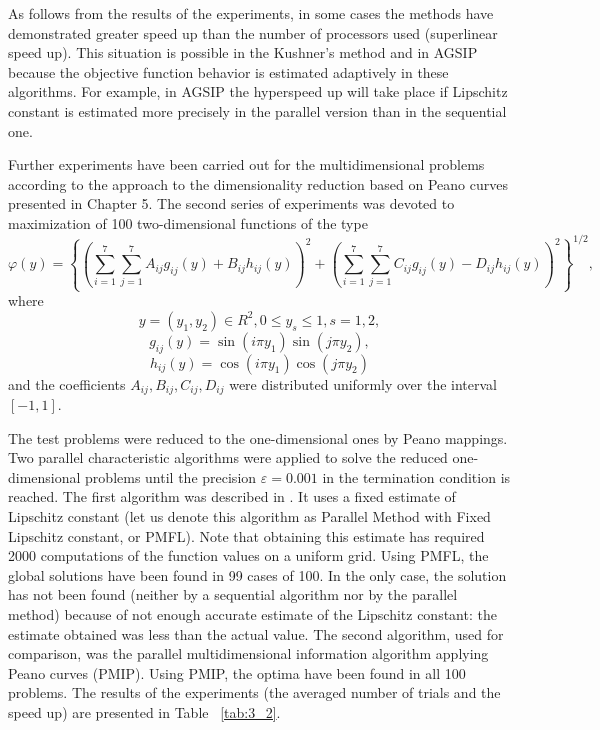 	As follows from the results of the experiments, in some cases the methods have demonstrated greater speed up than the number of processors used (superlinear speed up). This situation is possible in the Kushner's method and in AGSIP because the objective function behavior is estimated adaptively in these algorithms. For example, in AGSIP the hyperspeed up will take place if Lipschitz constant is estimated more precisely in the parallel version than in the sequential one. 
	
	Further experiments have been carried out for the multidimensional problems according to the approach to the dimensionality reduction based on Peano curves presented in Chapter 5. The second series of experiments was devoted to maximization of 100 two-dimensional functions of the type
	\begin{equation}
	\label{eq:3_58}
	\varphi(y)=\left\{\left(\sum _{i=1}^7\sum _{j=1}^7A_{ij} g_{ij} (y)+B_{ij}h_{ij}(y) \right)^2 +\left(\sum _{i=1}^7\sum _{j=1}^7C_{ij}g_{ij}(y)-D_{ij}h_{ij}(y)\right)^2 \right\}^{1/2},
	\end{equation}
	where 
	\begin{equation*}
	y=(y_1 ,y_2 )\in R^2 ,0\le y_s \le 1,s=1,2,
	\end{equation*}
	\begin{equation*}
	g_{ij} (y)=\sin (i\pi y_1 )\sin (j\pi y_2 ),
	\end{equation*}
	\begin{equation*}
	h_{ij} (y)=\cos (i\pi y_1 )\cos (j\pi y_2 )
	\end{equation*}
	 and the coefficients $A_{ij} ,B_{ij} ,C_{ij} ,D_{ij} $ were distributed uniformly over the interval $[-1,1]$.  

	The test problems were reduced to the one-dimensional ones by Peano mappings. Two parallel characteristic algorithms were applied to solve the reduced one-dimensional problems until the precision $\varepsilon =0.001$  in the termination condition is reached. The first algorithm was described in \cite{3_SergGri1994}. It uses a fixed estimate of Lipschitz constant (let us denote this algorithm as Parallel Method with Fixed Lipschitz constant, or PMFL). Note that obtaining this estimate has required 2000 computations of the function values on a uniform grid. Using PMFL, the global  solutions have been found in 99 cases of 100. In the only case, the solution has not been found (neither by a sequential algorithm nor by the parallel method) because of not enough accurate estimate of the Lipschitz constant: the estimate obtained was less than the actual value. The second algorithm, used for comparison, was the parallel multidimensional information algorithm applying Peano curves (PMIP). Using PMIP, the optima have been found in all 100 problems. The results of the experiments (the averaged number of trials and the speed up) are presented in Table ~\ref{tab:3_2}. 

